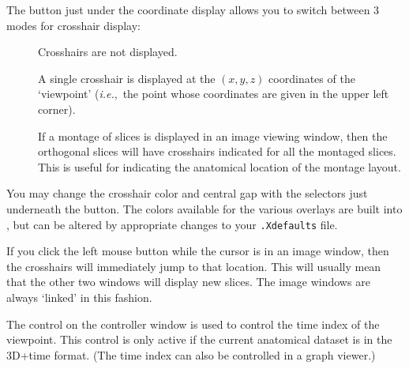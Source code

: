 The button  just under the coordinate display
allows you to switch between 3 modes for crosshair display:
\begin{description}
  \item[\blob{}] Crosshairs are not displayed.
  \item[\blob{}] A single crosshair is displayed at the
                      $(x,y,z)$ coordinates of the `viewpoint'
                      ({\it i.e.},~the point whose coordinates
                      are given in the upper left corner).
  \item[\blob{}] If a montage of slices is displayed in an image
                     viewing window, then the orthogonal slices will
                     have crosshairs indicated for all the montaged
                     slices.  This is useful for indicating the
                     anatomical location of the montage layout.
\end{description}
You may change the crosshair color and central gap
with the selectors just underneath the  button.
The colors available for the various overlays are built into \afni,
but can be altered by appropriate changes to your {\tt .Xdefaults}
file.

If you click the left mouse button while the cursor is in an image
window, then the crosshairs will immediately jump to that location.
This will usually mean that the other two windows will display new
slices.  The image windows are always `linked' in this fashion.

The  control on the \afnit controller window is
used to control the time index of the viewpoint.  This control
is only active if the current anatomical dataset is in the
3D+time format.  (The time index can also be controlled in
a graph viewer.)

